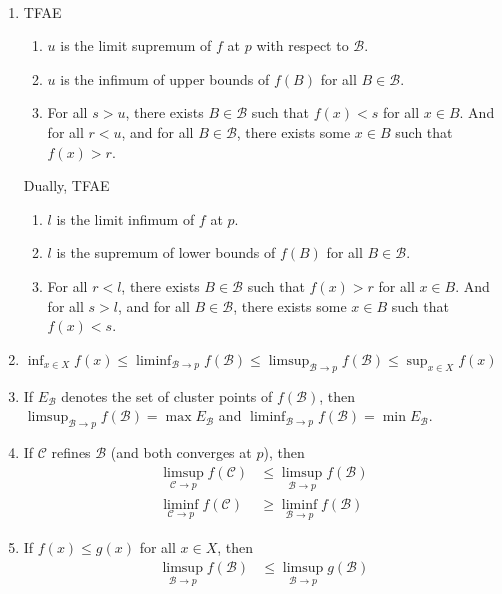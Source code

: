 \documentclass{treatise}
\begin{document}
\begin{proposition} \ 
\begin{enumerate}
    \item TFAE
    \begin{enumerate}
        \item $u$ is the limit supremum of $f$ at $p$ with respect to $\mathcal{B}$.
        \item $u$ is the infimum of upper bounds of $f(B)$ for all $B \in \mathcal{B}$.
        \item For all $s > u$, there exists $B \in \mathcal{B}$ such that $f(x) < s$ for all $x \in B$. And for all $r < u$, and for all $B \in \mathcal{B}$, there exists some $x \in B$ such that $f(x) > r$.
    \end{enumerate}
    Dually, TFAE
    \begin{enumerate}
        \item $l$ is the limit infimum of $f$ at $p$.
        \item $l$ is the supremum of lower bounds of $f(B)$ for all $B \in \mathcal{B}$.
        \item For all $r < l$, there exists $B \in \mathcal{B}$ such that $f(x) > r$ for all $x \in B$. And for all $s > l$, and for all $B \in \mathcal{B}$, there exists some $x \in B$ such that $f(x) < s$.
    \end{enumerate}
    \item $\inf_{x \in X} f(x) \leq \liminf_{\mathcal{B} \to p} f(\mathcal{B}) \leq \limsup_{\mathcal{B} \to p} f(\mathcal{B}) \leq \sup_{x \in X} f(x)$
    \item If $E_\mathcal{B}$ denotes the set of cluster points of $f(\mathcal{B})$, then $\limsup_{\mathcal{B} \to p} f(\mathcal{B}) = \max E_\mathcal{B}$ and $\liminf_{\mathcal{B} \to p} f(\mathcal{B}) = \min E_\mathcal{B}$.
    \item If $\mathcal{C}$ refines $\mathcal{B}$ (and both converges at $p$), then
    \begin{align*}
        \limsup_{\mathcal{C} \to p} f(\mathcal{C}) & \leq \limsup_{\mathcal{B} \to p} f(\mathcal{B})
        \\
        \liminf_{\mathcal{C} \to p} f(\mathcal{C}) & \geq \liminf_{\mathcal{B} \to p} f(\mathcal{B})
    \end{align*}
    \item If $f(x) \leq g(x)$ for all $x \in X$, then
    \begin{align*}
        \limsup_{\mathcal{B} \to p} f(\mathcal{B}) & \leq \limsup_{\mathcal{B} \to p} g(\mathcal{B})

\end{align*}
\end{enumerate}
\end{proposition}
\end{document}
